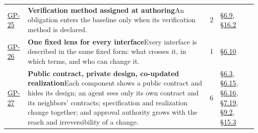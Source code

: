 \begin{longtable}{@{}p{} p{} r p{}@{}}
\hyperlink{gp-25}{GP-25}\hypertarget{gp-25}{} & \textbf{Verification method assigned at authoring}\newline An obligation enters the baseline only when its verification method is declared.\rule[-\normalbaselineskip]{0pt}{0pt} & 2 & \hyperlink{nss-6.9}{\S6.9}, \hyperlink{nss-16.2}{\S16.2}\rule[-\normalbaselineskip]{0pt}{0pt} \\
\hyperlink{gp-26}{GP-26}\hypertarget{gp-26}{} & \textbf{One fixed lens for every interface}\newline Every interface is described in the same fixed form: what crosses it, in which terms, and who can change it.\rule[-\normalbaselineskip]{0pt}{0pt} & 1 & \hyperlink{nss-6.10}{\S6.10}\rule[-\normalbaselineskip]{0pt}{0pt} \\
\hyperlink{gp-27}{GP-27}\hypertarget{gp-27}{} & \textbf{Public contract, private design, co-updated realization}\newline Each component shows a public contract and hides its design; an agent sees only its own contract and its neighbors' contracts; specification and realization change together; and approval authority grows with the reach and irreversibility of a change. & 6 & \hyperlink{nss-6.3}{\S6.3}, \hyperlink{nss-6.15}{\S6.15}, \hyperlink{nss-6.16}{\S6.16}, \hyperlink{nss-7.19}{\S7.19}, \hyperlink{nss-9.2}{\S9.2}, \hyperlink{nss-15.3}{\S15.3} \\
\bottomrule
\end{longtable}
\endgroup

